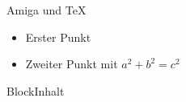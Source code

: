 \documentclass{beamer}
\begin{document}
\begin{frame}{Amiga und \TeX}
\begin{itemize}\item<1-> Erster Punkt \item<2-> Zweiter Punkt mit $a^2+b^2=c^2$\end{itemize}
\begin{block}{Block}Inhalt\end{block}
\end{frame}
\end{document}
